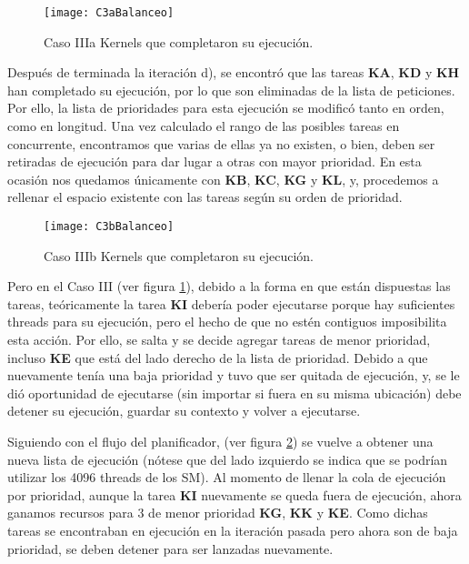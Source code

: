     \begin{figure}[!]
      \centering
        \texttt{[image: C3aBalanceo]}
        \caption{Caso IIIa Kernels que completaron su ejecución.}
        \label{fig:C3aBalanceo}
    \end{figure}

    Después de terminada la iteración d), se encontró que las tareas \textbf{KA}, \textbf{KD} y \textbf{KH} han completado su ejecución, por lo que son eliminadas de la lista de peticiones. Por ello, la lista de prioridades para esta ejecución se modificó tanto en orden, como en longitud. Una vez calculado el rango de las posibles tareas en concurrente, encontramos que varias de ellas ya no existen, o bien, deben ser retiradas de ejecución para dar lugar a otras con mayor prioridad. En esta ocasión nos quedamos únicamente con \textbf{KB}, \textbf{KC}, \textbf{KG} y \textbf{KL}, y, procedemos a rellenar el espacio existente con las tareas según su orden de prioridad. 
    \newline
    
    \begin{figure}[!]
      \centering
        \texttt{[image: C3bBalanceo]}
        \caption{Caso IIIb Kernels que completaron su ejecución.}
        \label{fig:C3bBalanceo}
    \end{figure}
    
    Pero en el Caso III (ver figura \ref{fig:C3aBalanceo}), debido a la forma en que están dispuestas las tareas, teóricamente la tarea \textbf{KI} debería poder ejecutarse porque hay suficientes threads para su ejecución, pero el hecho de que no estén contiguos imposibilita esta acción. 
    Por ello, se salta y se decide agregar tareas de menor prioridad, incluso \textbf{KE} que está del lado derecho de la lista de prioridad. Debido a que nuevamente tenía una baja prioridad y tuvo que ser quitada de ejecución, y, se le dió oportunidad de ejecutarse (sin importar si fuera en su misma ubicación) debe detener su ejecución, guardar su contexto y volver a ejecutarse.
\newline

    Siguiendo con el flujo del planificador, (ver figura \ref{fig:C3bBalanceo}) se vuelve a obtener una nueva lista de ejecución (nótese que del lado izquierdo se indica que se podrían utilizar los 4096 threads de los SM). Al momento de llenar la cola de ejecución por prioridad, aunque la tarea  \textbf{KI} nuevamente se queda fuera de ejecución, ahora ganamos recursos para 3 de menor prioridad \textbf{KG}, \textbf{KK} y \textbf{KE}. Como dichas tareas se encontraban en ejecución en la iteración pasada pero ahora son de baja prioridad, se deben detener para ser lanzadas nuevamente.
\newline

